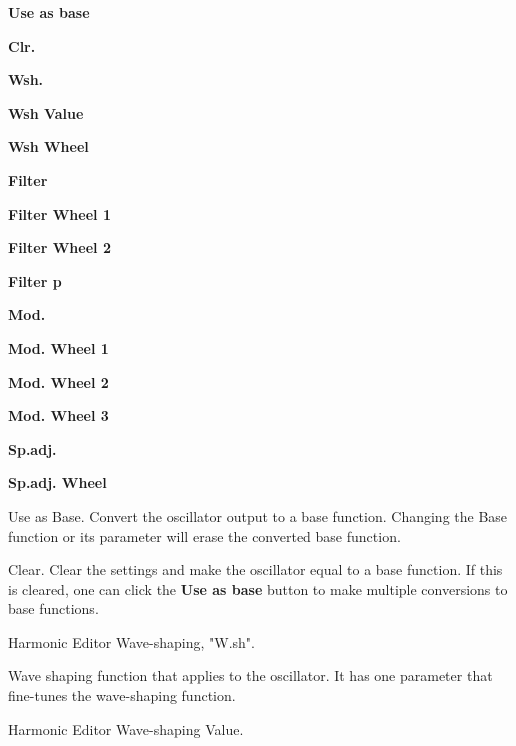    \begin{enumber}
      \item \textbf{Use as base}
      \item \textbf{Clr.}
      \item \textbf{Wsh.}
      \item \textbf{Wsh Value}
      \item \textbf{Wsh Wheel}
      \item \textbf{Filter}
      \item \textbf{Filter Wheel 1}
      \item \textbf{Filter Wheel 2}
      \item \textbf{Filter p}
      \item \textbf{Mod.}
      \item \textbf{Mod. Wheel 1}
      \item \textbf{Mod. Wheel 2}
      \item \textbf{Mod. Wheel 3}
      \item \textbf{Sp.adj.}
      \item \textbf{Sp.adj. Wheel}
   \end{enumber}

   \setcounter{ItemCounter}{0}      %

   Use as Base.
   Convert the oscillator output to a base function. Changing the Base
   function or its parameter will erase the converted base function.


   Clear.
   Clear the settings and make the oscillator equal to a base function. If
   this is cleared, one can click the \textbf{Use as base} button to make
   multiple conversions to base functions.

   Harmonic Editor Wave-shaping, "W.sh".

   Wave shaping function that applies to the oscillator.
   It has one parameter that fine-tunes the wave-shaping function.

   Harmonic Editor Wave-shaping Value.

